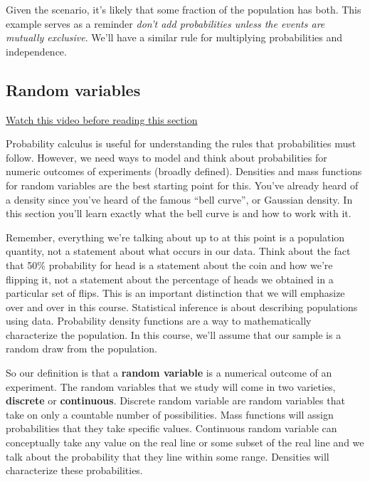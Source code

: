 \documentclass[]{article}
\begin{document}
Given the scenario, it's likely that some fraction of the population has
both. This example serves as a reminder \emph{don't add probabilities
unless the events are mutually exclusive}. We'll have a similar rule for
multiplying probabilities and independence.

\subsection{Random variables}\label{random-variables}

\href{http://youtu.be/Shzt9uZ8BII?list=PLpl-gQkQivXiBmGyzLrUjzsblmQsLtkzJ}{Watch
this video before reading this section}

Probability calculus is useful for understanding the rules that
probabilities must follow. However, we need ways to model and think
about probabilities for numeric outcomes of experiments (broadly
defined). Densities and mass functions for random variables are the best
starting point for this. You've already heard of a density since you've
heard of the famous ``bell curve'', or Gaussian density. In this section
you'll learn exactly what the bell curve is and how to work with it.

Remember, everything we're talking about up to at this point is a
population quantity, not a statement about what occurs in our data.
Think about the fact that 50\% probability for head is a statement about
the coin and how we're flipping it, not a statement about the percentage
of heads we obtained in a particular set of flips. This is an important
distinction that we will emphasize over and over in this course.
Statistical inference is about describing populations using data.
Probability density functions are a way to mathematically characterize
the population. In this course, we'll assume that our sample is a random
draw from the population.

So our definition is that a \textbf{random variable} is a numerical
outcome of an experiment. The random variables that we study will come
in two varieties, \textbf{discrete} or \textbf{continuous}. Discrete
random variable are random variables that take on only a countable
number of possibilities. Mass functions will assign probabilities that
they take specific values. Continuous random variable can conceptually
take any value on the real line or some subset of the real line and we
talk about the probability that they line within some range. Densities
will characterize these probabilities.
\end{document}
